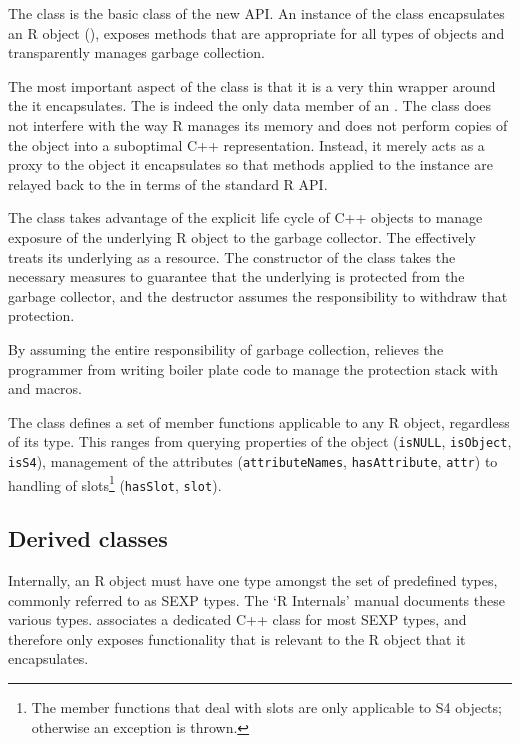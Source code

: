 The  class is the basic class of the new  API. 
An instance of the  class encapsulates an R object
(), exposes methods that are appropriate for all types 
of objects and transparently manages garbage collection.

The most important aspect of the  class is that it is 
a very thin wrapper around the  it encapsulates. The 
 is indeed the only data member of an . The 
 class does not interfere with the way R manages its 
memory and does not perform copies of the object into a suboptimal 
C++ representation. Instead, it merely acts as a proxy to the 
object it encapsulates so that methods applied to the 
instance are relayed back to the  in terms of the standard
R API.

The  class takes advantage of the explicit life cycle of 
C++ objects to manage exposure of the underlying R object to the 
garbage collector. The  effectively treats 
its underlying  as a resource.
The constructor of the  class takes 
the necessary measures to guarantee that the underlying 
is protected from the garbage collector, and the destructor
assumes the responsibility to withdraw that protection. 

By assuming the entire responsibility of garbage collection, 
relieves the programmer from writing boiler plate code to manage
the protection stack with  and  macros.

The  class defines a set of member functions applicable
to any R object, regardless of its type. This ranges from 
querying properties of the object (\texttt{isNULL}, \texttt{isObject}, 
\texttt{isS4}), management of the attributes 
(\texttt{attributeNames}, \texttt{hasAttribute}, \texttt{attr}) to 
handling of slots\footnote{The member functions that deal with slots
are only applicable to S4 objects; otherwise an exception is thrown.} 
(\texttt{hasSlot}, \texttt{slot}).

\subsection{Derived classes}

Internally, an R object must have one type amongst the set of 
predefined types, commonly referred to as SEXP types. The `R Internals'
manual \citep{R:ints} documents these various types. 
 associates a dedicated C++ class for most SEXP types, and
therefore only exposes functionality that is relevant to the R object
that it encapsulates.

